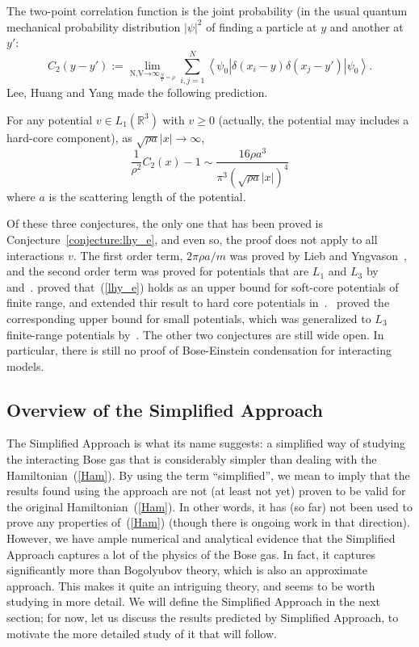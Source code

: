 \documentclass{ian}
\begin{document}
\indent
The two-point correlation function is the joint probability (in the usual quantum mechanical probability distribution $|\psi|^2$ of finding a particle at $y$ and another at $y'$:
\begin{equation}
  C_2(y-y'):=
  \lim_{\displaystyle\mathop{\scriptstyle N,V\to\infty}_{\frac NV=\rho}}
  \sum_{i,j=1}^N\left<\psi_0\right|\delta(x_i-y)\delta(x_j-y')\left|\psi_0\right>
  .
  \label{C2}
\end{equation}
Lee, Huang and Yang made the following prediction.
\bigskip

\label{conjecture:lhy_C2}
  For any potential $v\in L_1(\mathbb R^3)$ with $v\geqslant 0$ (actually, the potential may includes a hard-core component), as $\sqrt{\rho a}|x|\to \infty$,
  \begin{equation}
    \frac1{\rho^2}C_2(x)-1\sim\frac{16\rho a^3}{\pi^3(\sqrt{\rho a}|x|)^4}
  \end{equation}
  where $a$ is the scattering length of the potential.
\endtheo
\bigskip

\indent
Of these three conjectures, the only one that has been proved is Conjecture\-~\ref{conjecture:lhy_e}, and even so, the proof does not apply to all interactions $v$.
The first order term, $2\pi\rho a/m$ was proved by Lieb and Yngvason\-~\cite{LY98}, and the second order term was proved for potentials that are $L_1$ and $L_3$ by\-~\cite{FS20,FS23} and\-~\cite{YY09,BCS21}.
\cite{FS20} proved that\-~(\ref{lhy_e}) holds as an upper bound for soft-core potentials of finite range, and extended thir result to hard core potentials in\-~\cite{FS23}.
\cite{YY09}\-~proved the corresponding upper bound for small potentials, which was generalized to $L_3$ finite-range potentials by\-~\cite{BCS21}.
The other two conjectures are still wide open.
In particular, there is still no proof of Bose-Einstein condensation for interacting models.

\subsection{Overview of the Simplified Approach}
\indent
The Simplified Approach is what its name suggests: a simplified way of studying the interacting Bose gas that is considerably simpler than dealing with the Hamiltonian\-~(\ref{Ham}).
By using the term ``simplified'', we mean to imply that the results found using the approach are not (at least not yet) proven to be valid for the original Hamiltonian\-~(\ref{Ham}).
In other words, it has (so far) not been used to prove any properties of\-~(\ref{Ham}) (though there is ongoing work in that direction).
However, we have ample numerical and analytical evidence that the Simplified Approach captures a lot of the physics of the Bose gas.
In fact, it captures significantly more than Bogolyubov theory, which is also an approximate approach.
This makes it quite an intriguing theory, and seems to be worth studying in more detail.
We will define the Simplified Approach in the next section; for now, let us discuss the results predicted by Simplified Approach, to motivate the more detailed study of it that will follow.
\bigskip
\end{document}

